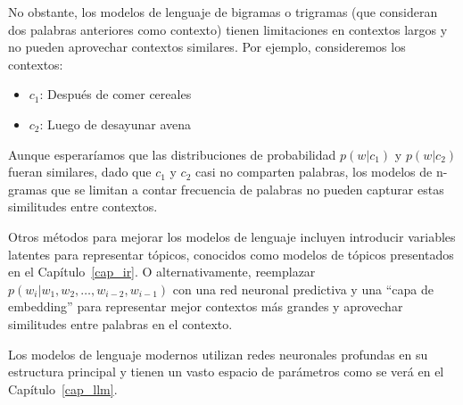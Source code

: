 No obstante, los modelos de lenguaje de bigramas o trigramas (que consideran dos palabras anteriores como contexto) tienen limitaciones en contextos largos y no pueden aprovechar contextos similares. Por ejemplo, consideremos los contextos:
\begin{itemize}
 \item $c_1$: Después de comer cereales
\item  $c_2$: Luego de desayunar avena
\end{itemize}

Aunque esperaríamos que las distribuciones de probabilidad $p(w|c_1)$ y $p(w|c_2)$ fueran similares, dado que $c_1$ y $c_2$ casi no comparten palabras, los modelos de n-gramas que se limitan a contar frecuencia de palabras no pueden capturar estas similitudes entre contextos.


Otros métodos para mejorar los modelos de lenguaje incluyen introducir variables latentes para representar tópicos, conocidos como modelos de tópicos \cite{blei2003latent} presentados en el Capítulo~\ref{cap_ir}. O alternativamente, reemplazar $p(w_i | w_1, w_2, \ldots, w_{i-2}, w_{i-1})$ con una red neuronal predictiva y una ``capa de embedding'' para representar mejor contextos más grandes y aprovechar similitudes entre palabras en el contexto. \cite{bengio2000neural}

Los modelos de lenguaje modernos utilizan redes neuronales profundas en su estructura principal y tienen un vasto espacio de parámetros como se verá en el Capítulo~\ref{cap_llm}.


